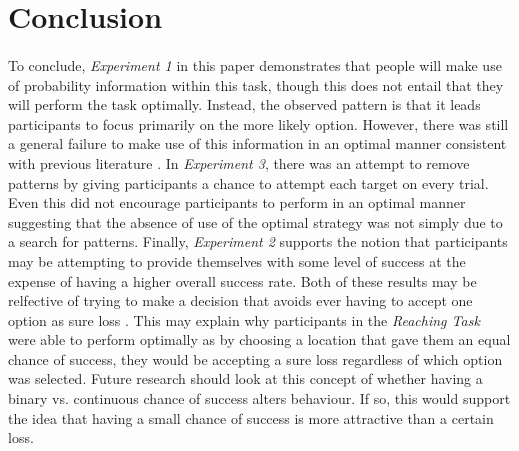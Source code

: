 \documentclass[12pt]{article}
\begin{document}
\section*{Conclusion}
\paragraph{} To conclude, \textit{Experiment 1} in this paper demonstrates that people will make use of probability information within this task, though this does not entail that they will perform the task optimally. Instead, the observed pattern is that it leads participants to focus primarily on the more likely option. However, there was still a general failure to make use of this information in an optimal manner consistent with previous literature \citep{koehler2014probability}. In \textit{Experiment 3}, there was an attempt to remove patterns by giving participants a chance to attempt each target on every trial. Even this did not encourage participants to perform in an optimal manner suggesting that the absence of use of the optimal strategy was not simply due to a search for patterns. Finally, \textit{Experiment 2} supports the notion that participants may be attempting to provide themselves with some level of success at the expense of having a higher overall success rate. Both of these results may be relfective of trying to make a decision that avoids ever having to accept one option as sure loss \cite{CHAPMAN2010168,KahnemanProspect,Hudson2007probmove}. This may explain why participants in the \textit{Reaching Task} \citep{clarke2015failure} were able to perform optimally as by choosing a location that gave them an equal chance of success, they would be accepting a sure loss regardless of which option was selected. Future research should look at this concept of whether having a binary vs. continuous chance of success alters behaviour. If so, this would support the idea that having a small chance of success is more attractive than a certain loss. 



\clearpage
\begingroup\onehalfspacing
\newpage
{}


\endgroup
\end{document}
